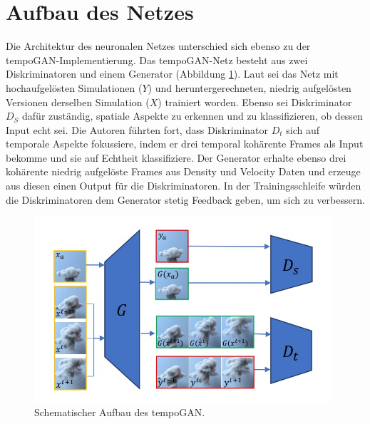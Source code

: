 \section{Aufbau des Netzes}
Die Architektur des neuronalen Netzes unterschied sich ebenso zu der tempoGAN-Implementierung. Das tempoGAN-Netz besteht aus zwei Diskriminatoren und einem Generator (Abbildung \ref{tempoGAN-Aufbau}). Laut \citet[]{xie2018tempoGAN} sei das Netz mit hochaufgelösten Simulationen ($Y$) und heruntergerechneten, niedrig aufgelösten Versionen derselben Simulation ($X$) trainiert worden. Ebenso sei Diskriminator $D_S$ dafür zuständig, spatiale Aspekte zu erkennen und zu klassifizieren, ob dessen Input echt sei. Die Autoren führten fort, dass Diskriminator $D_t$ sich auf temporale Aspekte fokussiere, indem er drei temporal kohärente Frames als Input bekomme und sie auf Echtheit klassifiziere. Der Generator erhalte ebenso drei kohärente niedrig aufgelöste Frames aus Density und Velocity Daten und erzeuge aus diesen einen Output für die Diskriminatoren. In der Trainingsschleife würden die Diskriminatoren dem Generator stetig Feedback geben, um sich zu verbessern. 

\begin{figure}[ht]
    \centering
    \includegraphics[width=11cm]{bilder/tempoGAN.jpg}
    \caption{Schematischer Aufbau des tempoGAN.}
    \label{tempoGAN-Aufbau}
\end{figure}

